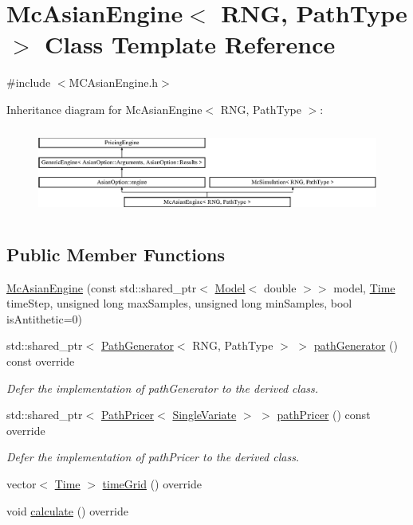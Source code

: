 \hypertarget{class_mc_asian_engine}{}\section{Mc\+Asian\+Engine$<$ R\+NG, Path\+Type $>$ Class Template Reference}
\label{class_mc_asian_engine}


{\ttfamily \#include $<$M\+C\+Asian\+Engine.\+h$>$}

Inheritance diagram for Mc\+Asian\+Engine$<$ R\+NG, Path\+Type $>$\+:\begin{figure}[H]
\begin{center}
\leavevmode
\includegraphics[height=2.894057cm]{class_mc_asian_engine}
\end{center}
\end{figure}
\subsection*{Public Member Functions}
\begin{DoxyCompactItemize}
\item 
\hyperlink{class_mc_asian_engine_a709959c19317f1dd319e043e409199fa}{Mc\+Asian\+Engine} (const std\+::shared\+\_\+ptr$<$ \hyperlink{class_model}{Model}$<$ double $>$$>$ model, \hyperlink{_name_def_8h_ac2d3e0ba793497bcca555c7c2cf64ff3}{Time} time\+Step, unsigned long max\+Samples, unsigned long min\+Samples, bool is\+Antithetic=0)
\item 
std\+::shared\+\_\+ptr$<$ \hyperlink{class_path_generator}{Path\+Generator}$<$ R\+NG, Path\+Type $>$ $>$ \hyperlink{class_mc_asian_engine_aafae065fc8b31b009b4b42a53b850e82}{path\+Generator} () const override
\begin{DoxyCompactList}\small\item\em Defer the implementation of path\+Generator to the derived class. \end{DoxyCompactList}\item 
std\+::shared\+\_\+ptr$<$ \hyperlink{class_path_pricer}{Path\+Pricer}$<$ \hyperlink{struct_single_variate}{Single\+Variate} $>$ $>$ \hyperlink{class_mc_asian_engine_a4ad8ccd05433f0668d751a8b3dcbb746}{path\+Pricer} () const override
\begin{DoxyCompactList}\small\item\em Defer the implementation of path\+Pricer to the derived class. \end{DoxyCompactList}\item 
vector$<$ \hyperlink{_name_def_8h_ac2d3e0ba793497bcca555c7c2cf64ff3}{Time} $>$ \hyperlink{class_mc_asian_engine_ad8d2c8721172ab1d7327db91a26c5052}{time\+Grid} () override
\item 
void \hyperlink{class_mc_asian_engine_ac16f4259846f55dc6c02d0b628f34e63}{calculate} () override
\end{DoxyCompactItemize}

